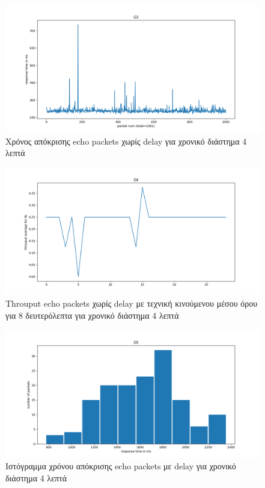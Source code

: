 \documentclass{article}
\begin{document}
\begin{figure}[H]
  \begin{center}
    \includegraphics[width=\textwidth]{G3.png}
  \end{center}
  \caption{Χρόνος απόκρισης echo packets χωρίς delay για χρονικό διάστημα 4 λεπτά}
\end{figure}

\begin{figure}[H]
  \begin{center}
    \includegraphics[width=\textwidth]{G4.png}
  \end{center}
  \caption{Throuput echo packets χωρίς delay με τεχνική κινούμενου μέσου όρου για 8
  δευτερόλεπτα για χρονικό διάστημα 4 λεπτά}
\end{figure}

\begin{figure}[H]
  \begin{center}
    \includegraphics[width=\textwidth]{G5.png}
  \end{center}
  \caption{Ιστόγραμμα χρόνου απόκρισης echo packets με delay για χρονικό διάστημα 4 λεπτά}
\end{figure}
\end{document}
